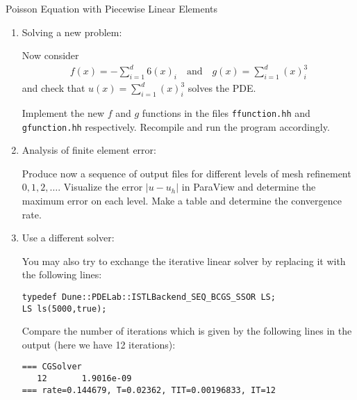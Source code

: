 \documentclass[12pt,a4paper]{article}
\begin{document}
\begin{Exercise}{Poisson Equation with Piecewise Linear Elements}
\begin{enumerate}
  In order to generate a set of output files you may set
  \begin{lstlisting}
refinement=0
  \end{lstlisting}
  and
  \begin{lstlisting}
[output]
filename=solution_0
  \end{lstlisting}
  and then
  \begin{lstlisting}
refinement=1
  \end{lstlisting}
  and
  \begin{lstlisting}
[output]
filename=solution_1
  \end{lstlisting}
  and so on.  You don't have to rebuild your program after changing
  the ini file.

  Now run the program for these settings. The solutions can be
  visualized using ParaView.  Note that you must press the
  \lstinline{Apply} button in the paraview user interface to see the
  loaded vtu/vtp files.  Use the Calculator filter to visualize the
  difference $|u-u_h|$ and determine the maximum error. Note that $u$
  and $u_h$ are called \lstinline{exact} and \lstinline{fesol} in
  the parview output.

\item {\sc Solving a new problem}:

  Now consider
  \begin{align}
    f(x) =  -\sum_{i=1}^d 6(x)_i \quad\text{and}\quad  g(x) = \sum_{i=1}^d (x)_i^3
  \end{align}
  and check that $u(x)=\sum_{i=1}^d (x)_i^3$ solves the PDE.

  Implement the new $f$ and $g$ functions in the files
  \lstinline{ffunction.hh} and \lstinline{gfunction.hh}
  respectively. Recompile and run the program accordingly.

\item {\sc Analysis of finite element error}:

  Produce now a sequence of output files for different levels of mesh
  refinement $0, 1, 2, \ldots$. Visualize the error $|u-u_h|$ in
  ParaView and determine the maximum error on each level.  Make a
  table and determine the convergence rate.

\item {\sc Use a different solver}:

You may also try to exchange the iterative linear solver by
replacing it with the following lines:
\begin{lstlisting}
typedef Dune::PDELab::ISTLBackend_SEQ_BCGS_SSOR LS;
LS ls(5000,true);
\end{lstlisting}
Compare the number of iterations which is given by the following lines
in the output (here we have 12 iterations):
\begin{lstlisting}
=== CGSolver
   12       1.9016e-09
=== rate=0.144679, T=0.02362, TIT=0.00196833, IT=12
\end{lstlisting}
\end{enumerate}
\end{Exercise}
\end{document}
